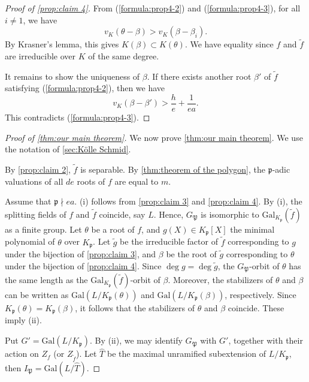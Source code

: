 \documentclass[10pt,a4paper]{amsart}
\newcommand{\Gal}{\mathrm{Gal}}
\numberwithin{equation}{section}
\begin{document}
\begin{proof}[Proof of \cref{prop:claim 4}]
    From (\ref{formula:prop4-2}) and (\ref{formula:prop4-3}), for all $i \ne 1$, 
    we have 
    \[
      v_K(\theta - \beta) > v_K(\beta - \beta_i). 
    \]
    By Krasner's lemma, this gives $K(\beta) \subset K(\theta)$. 
    We have equality since $f$ and $\tilde{f}$ are irreducible over $K$ of the same degree. 

    It remains to show the uniqueness of $\beta$. 
    If there exists another root $\beta'$ of $\tilde{f}$ satisfying (\ref{formula:prop4-2}), then we have 
    \[
      v_K(\beta - \beta') > \frac{h}{e} + \frac{1}{ea}. 
    \]
    This contradicts (\ref{formula:prop4-3}). 
  \end{proof}


  \begin{proof}[Proof of \cref{thm:our main theorem}]
  We now prove \cref{thm:our main theorem}. 
  We use the notation of \cref{sec:Kölle Schmid}. 

  By \cref{prop:claim 2}, $\tilde{f}$ is separable. 
  By \cref{thm:theorem of the polygon}, the $\mathfrak{p}$-adic valuations of all $de$ roots of $f$ are equal to $m$. 

  Assume that $\mathfrak{p} \nmid ea$. 
  (i) follows from \cref{prop:claim 3} and \cref{prop:claim 4}. 
  By (i), the splitting fields of $f$ and $\tilde{f}$ coincide, say $L$.
  Hence, $G_{\mathfrak{P}}$ is isomorphic to $\Gal_{K_{\mathfrak{p}}}(\tilde{f})$ as a finite group. 
  Let $\theta$ be a root of $f$, and $g(X) \in K_{\mathfrak{p}}[X]$ the minimal polynomial of $\theta$ over $K_{\mathfrak{p}}$. 
  Let $\tilde{g}$ be the irreducible factor of $\tilde{f}$ corresponding to $g$ under the bijection of \cref{prop:claim 3}, and 
  $\beta$ be the root of $\tilde{g}$ corresponding to $\theta$ under the bijection of \cref{prop:claim 4}. 
  Since $\deg g = \deg \tilde{g}$, the $G_{\mathfrak{P}}$-orbit of $\theta$ has the same length as the $\Gal_{K_{\mathfrak{p}}}(\tilde{f})$-orbit of $\beta$. 
  Moreover, the stabilizers of $\theta$ and $\beta$ can be written as $\Gal(L/K_{\mathfrak{p}}(\theta))$ and $\Gal(L/K_{\mathfrak{p}}(\beta))$, respectively. 
  Since $K_{\mathfrak{p}}(\theta) = K_{\mathfrak{p}}(\beta)$, it follows that the stabilizers of $\theta$ and $\beta$ coincide. 
  These imply (ii). 

  Put $G' = \Gal(L/K_{\mathfrak{p}})$. By (ii), we may identify $G_{\mathfrak{P}}$ with $G'$, together with their action on $Z_f$ (or $Z_{\tilde{f}}$). 
  Let $\hat{T}$ be the maximal unramified subextension of $L/K_{\mathfrak{p}}$, then $I_{\mathfrak{P}} = \Gal(L/\hat{T})$. 


\end{proof}
\end{document}
